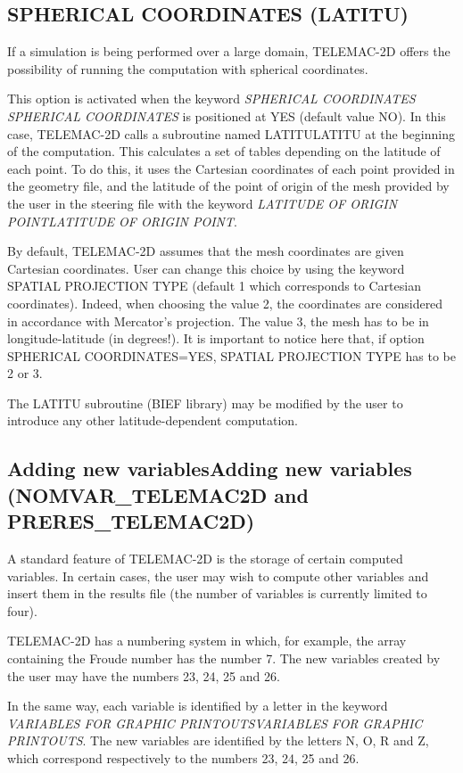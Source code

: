\documentclass{article} %
\begin{document}
\subsection{ SPHERICAL COORDINATES (LATITU) }

 If a simulation is being performed over a large domain, TELEMAC-2D offers the possibility of running the computation with spherical coordinates.

 This option is activated when the keyword \textit{SPHERICAL COORDINATES} \textit{SPHERICAL COORDINATES} is positioned at YES (default value NO). In this case, TELEMAC-2D calls a subroutine named LATITULATITU at the beginning of the computation. This calculates a set of tables depending on the latitude of each point. To do this, it uses the Cartesian coordinates of each point provided in the geometry file, and the latitude of the point of origin of the mesh provided by the user in the steering file with the keyword \textit{LATITUDE OF ORIGIN POINTLATITUDE OF ORIGIN POINT}.

 By default, TELEMAC-2D assumes that the mesh coordinates are given Cartesian coordinates. User can change this choice by using the keyword SPATIAL PROJECTION TYPE (default 1 which corresponds to Cartesian coordinates). Indeed, when choosing the value 2, the coordinates are considered in accordance with Mercator's projection. The value 3, the mesh has to be in longitude-latitude (in degrees!). It is important to notice here that, if option SPHERICAL COORDINATES=YES, SPATIAL PROJECTION TYPE has to be 2 or 3.

 The LATITU subroutine (BIEF library) may be modified by the user to introduce any other latitude-dependent computation.


\subsection{ Adding new variablesAdding new variables (NOMVAR\_TELEMAC2D and PRERES\_TELEMAC2D)}

 A standard feature of TELEMAC-2D is the storage of certain computed variables. In certain cases, the user may wish to compute other variables and insert them in the results file (the number of variables is currently limited to four).

 TELEMAC-2D has a numbering system in which, for example, the array containing the Froude number has the number 7. The new variables created by the user may have the numbers 23, 24, 25 and 26.

 In the same way, each variable is identified by a letter in the keyword \textit{VARIABLES FOR GRAPHIC PRINTOUTSVARIABLES FOR GRAPHIC PRINTOUTS}. The new variables are identified by the letters N, O, R and Z, which correspond respectively to the numbers 23, 24, 25 and 26.
\end{document}
